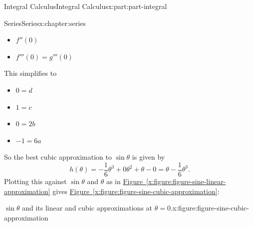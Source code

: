 \documentclass[twoside,10pt,]{book}
\newcommand{\xreffont}{\relax}
\numberwithin{equation}{part}
\begin{document}
\begin{partptx}{Integral Calculus}{}{Integral Calculus}{}{}{x:part:part-integral}
\begin{chapterptx}{Series}{}{Series}{}{}{x:chapter:series}
\begin{introduction}{}
\begin{itemize}[label=\textbullet]
\item{}\(\displaystyle f''(0)\)%
\item{}\(\displaystyle f'''(0) = g'''(0)\)%
\end{itemize}
This simplifies to%
%
\begin{itemize}[label=\textbullet]
\item{}\(\displaystyle 0 = d\)%
\item{}\(\displaystyle 1 = c\)%
\item{}\(\displaystyle 0 = 2b\)%
\item{}\(\displaystyle -1 = 6a\)%
\end{itemize}
So the best cubic approximation to \(\sin\theta\) is given by%
\begin{equation*}
h(\theta) = -\frac{1}{6}\theta^{3} + 0\theta^{2} + \theta - 0 = \theta  -\frac{1}{6}\theta^{3}.
\end{equation*}
Plotting this against \(\sin \theta\) and \(\theta\) as in \hyperref[x:figure:figure-sine-linear-approximation]{Figure~{\xreffont\ref{x:figure:figure-sine-linear-approximation}}} gives \hyperref[x:figure:figure-sine-cubic-approximation]{Figure~{\xreffont\ref{x:figure:figure-sine-cubic-approximation}}}:%
\begin{figureptx}{\(\sin\theta\) and its linear and cubic approximations at \(\theta=0\).}{x:figure:figure-sine-cubic-approximation}{}%
\begin{image}{0}{1}{0}%
\end{image}
\end{figureptx}
\end{introduction}
\end{chapterptx}
\end{partptx}
\end{document}

